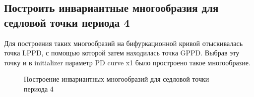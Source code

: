 \documentclass[12pt, a4paper]{article}
\begin{document}
\subsection{Построить инвариантные многообразия для седловой точки периода 4}
Для построения таких многообразий на бифуркационной кривой отыскивалась точка LPPD, с помощью которой затем находилась точка GPPD. Выбрав эту точку и в initializer параметр PD curve x1 было простроено такое многообразие.
\begin{figure}[H]
	\caption{Построение инвариантных многообразий для седловой точки периода 4}
\end{figure}
\end{document}
